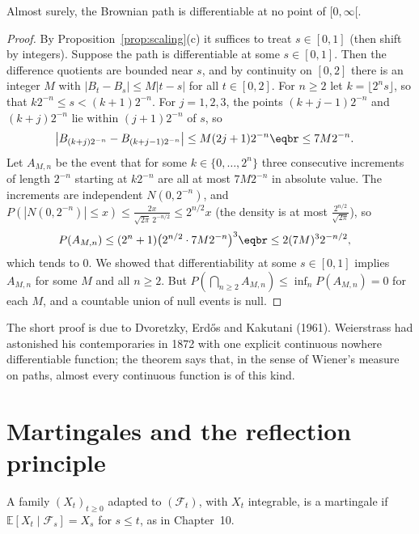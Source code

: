 \begin{theorem}\label{thm:pwz}
Almost surely, the Brownian path is differentiable at no point of $[0,\infty[$.
\end{theorem}
\begin{proof}
By Proposition~\ref{prop:scaling}(c) it suffices to treat $s\in[0,1]$ (then shift by integers). Suppose the path is differentiable at some $s\in[0,1]$. Then the
difference quotients are bounded near $s$, and by continuity on $[0,2]$ there is an integer $M$ with $|B_t-B_s|\le M|t-s|$ for all $t\in[0,2]$. For $n\ge2$ let
$k=\lfloor2^ns\rfloor$, so that $k2^{-n}\le s<(k+1)2^{-n}$. For $j=1,2,3$, the points $(k+j-1)2^{-n}$ and $(k+j)2^{-n}$ lie within $(j+1)2^{-n}$ of $s$, so
\[
\begin{aligned}\bigl|B_{(k+j)2^{-n}}-B_{(k+j-1)2^{-n}}\bigr|&\le M(2j+1)2^{-n}\eqbr\le7M2^{-n}.\end{aligned}
\]
Let $A_{M,n}$ be the event that for some $k\in\{0,\dots,2^n\}$ three consecutive increments of length $2^{-n}$ starting at $k2^{-n}$ are all at most $7M2^{-n}$ in absolute value.
The increments are independent $N(0,2^{-n})$, and $P(|N(0,2^{-n})|\le x)\le\frac{2x}{\sqrt{2\pi}\,2^{-n/2}}\le2^{n/2}x$ (the density is at most $\frac{2^{n/2}}{\sqrt{2\pi}}$), so
\[
\begin{aligned}P(A_{M,n})&\le(2^n+1)\bigl(2^{n/2}\cdot7M2^{-n}\bigr)^3\eqbr\le2(7M)^32^{-n/2},\end{aligned}
\]
which tends to $0$. We showed that differentiability at some $s\in[0,1]$ implies $A_{M,n}$ for some $M$ and all $n\ge2$. But $P(\bigcap_{n\ge2}A_{M,n})\le\inf_nP(A_{M,n})=0$ for each $M$, and a
countable union of null events is null.
\end{proof}

The short proof is due to Dvoretzky, Erd\H os and Kakutani (1961). Weierstrass had astonished his contemporaries in 1872 with
one explicit continuous nowhere differentiable function; the theorem says that, in the sense of Wiener's measure on
paths, almost every continuous function is of this kind.

\section{Martingales and the reflection principle}

A family $(X_t)_{t\ge0}$ adapted to $(\mathcal F_t)$, with $X_t$ integrable, is a martingale if $\mathbb E[X_t\mid\mathcal F_s]=X_s$ for $s\le t$, as in Chapter~10.

